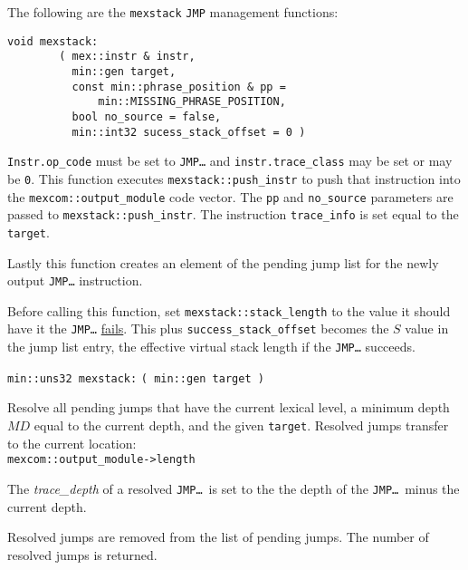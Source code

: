 \documentclass[12pt]{article}
\begin{document}
The following are the {\tt mexstack} {\tt JMP}
management functions:

\verb|void mexstack:| 
		      \label{PUSH-JMP-INSTR} \\
\verb|        ( mex::instr & instr,| \\
\verb|          min::gen target,| \\
\verb|          const min::phrase_position & pp =| \\
\verb|              min::MISSING_PHRASE_POSITION,| \\
\verb|          bool no_source = false,| \\
\verb|          min::int32 sucess_stack_offset = 0 )|
\begin{indpar}
{\tt Instr.op\_code} must be set to {\tt JMP\ldots}
and {\tt instr.trace\_class} may be set or may be {\tt 0}.
This function executes {\tt mexstack::push\_instr}
to push that instruction into the {\tt mexcom::\EOL output\_\EOL module}
code vector.  The {\tt pp} and {\tt no\_source}
parameters are passed to {\tt mexstack::\EOL push\_\EOL instr}.
The instruction {\tt trace\_info} is set equal to the {\tt target}.

Lastly this function creates an element of the pending jump list
for the newly output {\tt JMP\ldots} instruction.

Before calling this function, set {\tt mexstack::stack\_length} to the
value it should have it the {\tt JMP\ldots} \underline{fails}.  This
plus {\tt success\_stack\_offset} becomes the $S$ value in the jump list entry,
the effective virtual stack length if the {\tt JMP\ldots}
succeeds.
\end{indpar}

\verb|min::uns32 mexstack:| \label{JMP-TARGET}
    \verb|( min::gen target )|
\begin{indpar}
Resolve all pending jumps that have the current lexical level, a minimum
depth $MD$ equal to the current depth, and the
given {\tt target}.
Resolved jumps transfer to the current location: \\
\hspace*{3em}\verb|mexcom::output_module->length|

The {\em trace\_depth} of a resolved {\tt JMP\ldots}~is set to the the depth 
of the {\tt JMP\ldots}~minus the current depth.

Resolved jumps are removed from the list
of pending jumps.  The number of resolved jumps is returned.
\end{indpar}
\end{document}
